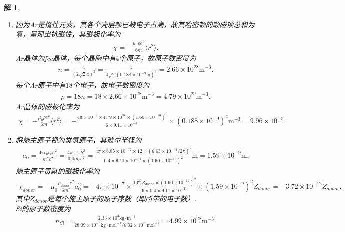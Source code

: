 \documentclass[UTF8,10pt,a4paper]{article}
\theoremstyle{Problem}
\theoremstyle{Solution}
\newtheorem*{sol}{解}
\begin{document}
\begin{sol}
    \begin{enumerate}
        \item[(a)] 因为Ar是惰性元素，其各个壳层都已被电子占满，故其哈密顿的顺磁项总和为零，呈现出抗磁性，其磁极化率为
        \begin{align}
            \chi=-\frac{\mu_0\rho e^2}{6m}\langle r^2\rangle.
        \end{align}
        Ar晶体为fcc晶体，每个晶胞中有$4$个原子，故原子数密度为
        \begin{align}
            n=\frac{4}{(2\sqrt{2}a)^3}=\frac{1}{4\sqrt{2}(0.188\times 10^{-9}\text{m})^3}=2.66\times 10^{28}\text{m}^{-3}.
        \end{align}
        每个Ar原子中有$18$个电子，故电子数密度为
        \begin{align}
            \rho=18n=18\times 2.66\times 10^{28}\text{m}^{-3}=4.79\times 10^{29}\text{m}^{-3}.
        \end{align}
        Ar晶体的磁极化率为
        \begin{align}
            \chi=-\frac{\mu_0\rho e^2}{6m}\langle r^2\rangle=-\frac{4\pi\times 10^{-7}\times 4.79\times 10^{28}\times(1.60\times 10^{-19})^2}{6\times 9.11\times 10^{-31}}\times(0.188\times 10^{-9})^2\text{m}^{-3}=9.96\times 10^{-5}.
        \end{align}
        \item[(b)] 将施主原子视为类氢原子，其玻尔半径为
        \begin{align}
            a_0=\frac{4\pi\epsilon_0\epsilon_r\hbar^2}{m^*e^2}=\frac{4\pi\epsilon_0\epsilon_r\hbar^2}{0.4m_ee^2}=\frac{4\pi\times 8.85\times 10^{-12}\times 12\times(6.63\times 10^{-34}/2\pi)^2}{0.4\times 9.11\times 10^{-31}\times(1.60\times 10^{-19})^2}\text{m}=1.59\times 10^{-9}\text{m}.
        \end{align}
        施主原子贡献的磁极化率为
        \begin{align}
            \chi_{donor}=-\mu_0\frac{\rho_{donor}e^2}{6m^*}a_0^2=-4\pi\times 10^{-7}\times\frac{10^{20}Z_{donor}\times(1.60\times 10^{-19})^2}{6\times 0.4\times 9.11\times 10^{-31}}\times(1.59\times 10^{-9})^2Z_{donor}=-3.72\times 10^{-12}Z_{donor},
        \end{align}
        其中$Z_{donor}$是每个施主原子的原子序数（即所带的电子数）.\\
        Si的原子数密度为
        \begin{align}
            n_{Si}=\frac{2.33\times 10^3\text{kg}/\text{m}^{-3}}{28.09\times 10^{-3}\text{kg}\cdot\text{mol}^{-1}/6.02\times 10^{23}\text{mol}^{-1}}=4.99\times 10^{28}\text{m}^{-3}.

\end{align}
\end{enumerate}
\end{sol}
\end{document}
